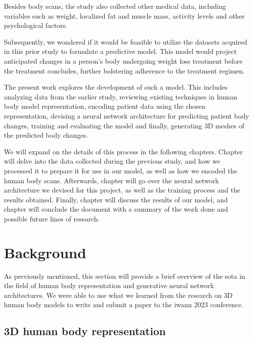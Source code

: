 Besides body scans, the study also collected other medical data, including
variables such as weight, localized fat and muscle mass, activity levels and
other psychological factors.

Subsequently, we wondered if it would be feasible to utilize the datasets
acquired in this prior study to formulate a predictive model. This model would
project anticipated changes in a person's body undergoing weight loss treatment
before the treatment concludes, further bolstering adherence to the treatment
regimen.

The present work explores the development of such a model. This includes
analyzing data from the earlier study, reviewing existing techniques in human
body model representation, encoding patient data using the chosen
representation, devising a neural network architecture for predicting patient
body changes, training and evaluating the model and finally, generating 3D
meshes of the predicted body changes.

We will expand on the details of this process in the following chapters.
Chapter  will delve into the data collected during the
previous study, and how we processed it to prepare it for use in our model, as
well as how we encoded the human body scans. Afterwards, chapter
 will go over the neural network architecture we devised for
this project, as well as the training process and the results obtained.
Finally, chapter  will discuss the results of our model,
and chapter  will conclude the document with a summary
of the work done and possible future lines of research.

\section{Background}

As previously mentioned, this section will provide a brief overview of the
\gls{sota} in the field of human body representation and generative neural
network architectures. We were able to use what we learned from the research on
3D human body models to write and submit a paper to the \gls{iwann} 2023
conference. 

\subsection{3D human body representation}

